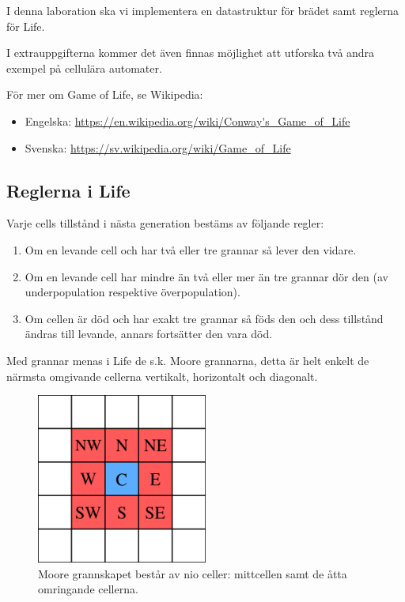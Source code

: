 \vspace{5mm}

I denna laboration ska vi implementera en datastruktur för brädet samt reglerna för Life.

I extrauppgifterna kommer det även finnas möjlighet att utforska två andra exempel på cellulära automater.

\vspace{5mm}

För mer om Game of Life, se Wikipedia:

\begin{itemize}[noitemsep,topsep=0pt]
    	\item Engelska: \url{https://en.wikipedia.org/wiki/Conway's_Game_of_Life}
    	\item Svenska: \url{https://sv.wikipedia.org/wiki/Game_of_Life}
\end{itemize}


\subsection{Reglerna i Life}
\label{subsec:life-rules}

Varje cells tillstånd i nästa generation bestäms av följande regler:
\begin{enumerate}
    \item Om en levande cell och har två eller tre grannar så lever den vidare.
    \item Om en levande cell har mindre än två eller mer än tre grannar dör den (av underpopulation respektive överpopulation).
    \item Om cellen är död och har exakt tre grannar så föds den och dess tillstånd ändras till levande, annars fortsätter den vara död.
\end{enumerate}

Med grannar menas i Life de s.k. Moore grannarna, detta är helt enkelt de närmsta omgivande cellerna vertikalt, horizontalt och diagonalt.

\begin{figure}[h]
  \begin{center}
    \includegraphics[width=0.5\textwidth]{../img/w12-lab/moore_neighborhood.png}
  \end{center}
  \caption{Moore grannskapet består av nio celler: mittcellen samt de åtta omringande cellerna.\protect\footnotemark}
\end{figure}


